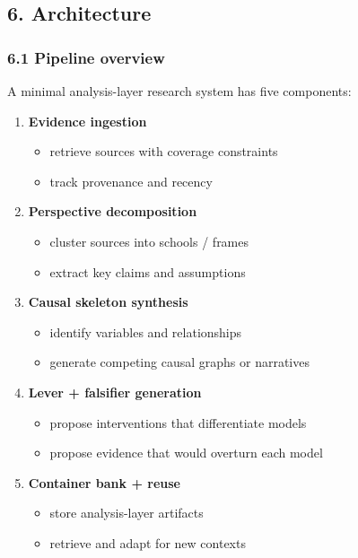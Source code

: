 \documentclass[11pt]{article}
\providecommand{\tightlist}{%
  \setlength{\itemsep}{0pt}\setlength{\parskip}{0pt}}
\begin{document}
\hypertarget{architecture}{%
\subsection{6. Architecture}\label{architecture}}

\hypertarget{pipeline-overview}{%
\subsubsection{6.1 Pipeline overview}\label{pipeline-overview}}

A minimal analysis-layer research system has five components:

\begin{enumerate}
\def\labelenumi{\arabic{enumi})}
\tightlist
\item
  \textbf{Evidence ingestion}

  \begin{itemize}
  \tightlist
  \item
    retrieve sources with coverage constraints
  \item
    track provenance and recency
  \end{itemize}
\item
  \textbf{Perspective decomposition}

  \begin{itemize}
  \tightlist
  \item
    cluster sources into schools / frames
  \item
    extract key claims and assumptions
  \end{itemize}
\item
  \textbf{Causal skeleton synthesis}

  \begin{itemize}
  \tightlist
  \item
    identify variables and relationships
  \item
    generate competing causal graphs or narratives
  \end{itemize}
\item
  \textbf{Lever + falsifier generation}

  \begin{itemize}
  \tightlist
  \item
    propose interventions that differentiate models
  \item
    propose evidence that would overturn each model
  \end{itemize}
\item
  \textbf{Container bank + reuse}

  \begin{itemize}
  \tightlist
  \item
    store analysis-layer artifacts
  \item
    retrieve and adapt for new contexts
  \end{itemize}
\end{enumerate}
\end{document}
